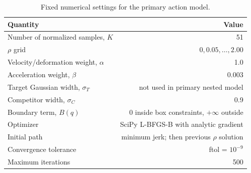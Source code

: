 \begin{table}[htbp]
\centering
\caption{Fixed numerical settings for the primary action model.}
\label{tab:numerical-settings}
\begin{tabular}{l r}
\toprule
Quantity & Value \\
\midrule
Number of normalized samples, $K$ & 51 \\
$\rho$ grid & $0,0.05,\ldots,2.00$ \\
Velocity/deformation weight, $\alpha$ & 1.0 \\
Acceleration weight, $\beta$ & 0.003 \\
Target Gaussian width, $\sigma_T$ & not used in primary nested model \\
Competitor width, $\sigma_C$ & 0.9 \\
Boundary term, $B(q)$ & 0 inside box constraints, $+\infty$ outside \\
Optimizer & SciPy L-BFGS-B with analytic gradient \\
Initial path & minimum jerk; then previous $\rho$ solution \\
Convergence tolerance & ftol = $10^{-9}$ \\
Maximum iterations & 500 \\
\bottomrule
\end{tabular}
\end{table}
